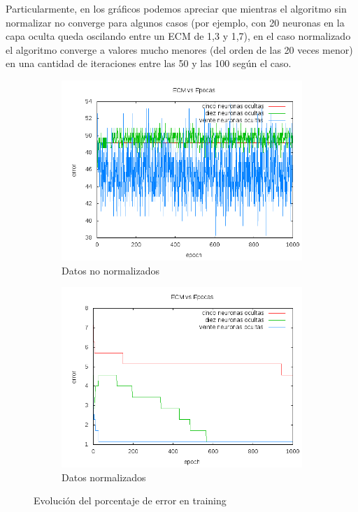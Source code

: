 \documentclass[12pt]{article}
\begin{document}

Particularmente, en los gráficos podemos apreciar que mientras el algoritmo sin normalizar no converge para algunos casos (por ejemplo, con 20 neuronas en la capa oculta queda oscilando entre un ECM de 1,3 y 1,7), en el caso normalizado el algoritmo converge a valores mucho menores (del orden de las 20 veces menor) en una cantidad de iteraciones entre las 50 y las 100 según el caso.


\begin{figure}[!ht]
\centering
    \begin{subfigure}[b]{0.5\textwidth}            
            \centering
            \includegraphics[width=\textwidth]{recursos/error_pr4}
            \caption{Datos no normalizados}
            \label{fig:error_pr4}
    \end{subfigure}%
    \begin{subfigure}[b]{0.5\textwidth}
            \centering
            \includegraphics[width=\textwidth]{recursos/error_pr4_norm}
            \caption{Datos normalizados}
            \label{fig:error_pr4_norm}
    \end{subfigure}
    \caption{Evoluci\'on del porcentaje de error en training}
  \label{fig:error_vsnorm}
\end{figure}
\end{document}

